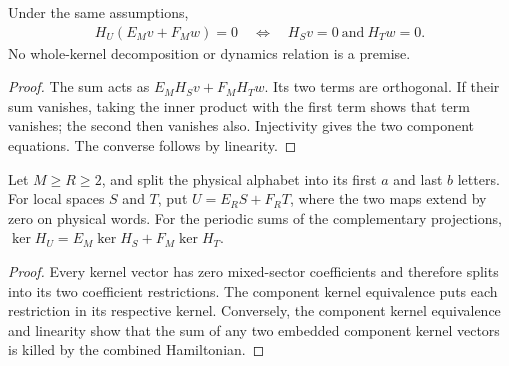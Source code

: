 \begin{lemma}
    \label{lem:physical_sector_sum_kernel_iff}
    \leanok
    Under the same assumptions,
    \begin{align}
        H_U(E_Mv+F_Mw)=0
        \quad\Longleftrightarrow\quad H_Sv=0\ \text{and}\ H_Tw=0.
    \end{align}
    No whole-kernel decomposition or dynamics relation is a premise.
\end{lemma}
\begin{proof}
    \leanok
    The sum acts as $E_MH_Sv+F_MH_Tw$. Its two terms are orthogonal.
    If their sum vanishes, taking the inner product with the first term
    shows that term vanishes; the second then vanishes also. Injectivity
    gives the two component equations. The converse follows by linearity.
\end{proof}

\begin{lemma}
    \label{lem:physical_sum_full_kernel}
    \leanok
    Let $M\ge R\ge2$, and split the physical alphabet into its first $a$
    and last $b$ letters. For local spaces $S$ and $T$, put
    $U=E_RS+F_RT$, where the two maps extend by zero on physical words.
    For the periodic sums of the complementary projections,
    $\ker H_U=E_M\ker H_S+F_M\ker H_T$.
\end{lemma}
\begin{proof}
    \leanok
    Every kernel vector has zero mixed-sector coefficients and therefore
    splits into its two coefficient restrictions. The component
    kernel equivalence puts each restriction in its respective kernel.
    Conversely, the component kernel equivalence and linearity show that
    the sum of any two embedded component kernel vectors is killed by
    the combined Hamiltonian.
\end{proof}

